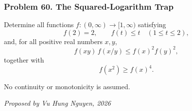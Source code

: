 \subsubsection*{Problem 60. The Squared-Logarithm Trap}

\begin{exercisebox}[hard]

Determine all functions $f:(0,\infty)\to[1,\infty)$ satisfying
\[
f(2)=2,\qquad f(t)\le t\quad(1\le t\le2),
\]
and, for all positive real numbers $x,y$,
\[
\boxed{\qquad
f(xy)\,f(x/y)\le f(x)^2f(y)^2,
\qquad} \tag{1}
\]
together with
\[
\boxed{\qquad
f(x^2)\ge f(x)^4.
\qquad} \tag{2}
\]

No continuity or monotonicity is assumed.

\begin{flushright}
\textit{Proposed by Vu Hung Nguyen, 2026}
\end{flushright}


\end{exercisebox}

